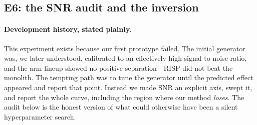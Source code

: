 \subsection{E6: the SNR audit and the inversion}
\label{sec:dd5-e6}

\paragraph{Development history, stated plainly.} This experiment exists
because our first prototype failed. The initial generator was, we later
understood, calibrated to an effectively high signal-to-noise ratio, and
the arm lineup showed no positive separation---RISP did not beat the
monolith. The tempting path was to tune the generator until the predicted
effect appeared and report that point. Instead we made SNR an explicit
axis, swept it, and report the whole curve, including the region where our
method \emph{loses}. The audit below is the honest version of what could
otherwise have been a silent hyperparameter search.

